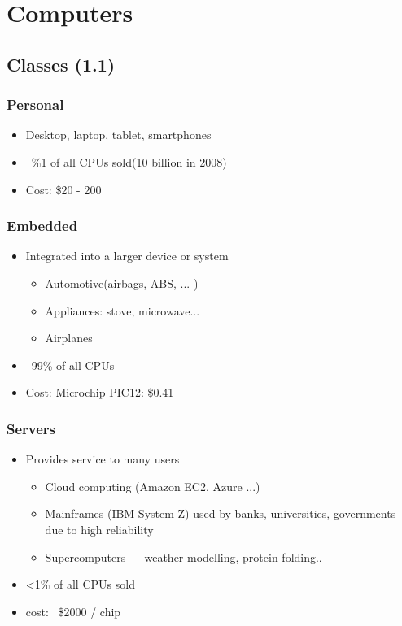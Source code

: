 \chapter{Computers}
  \section{Classes (1.1)}

    \subsection{Personal}
      \begin{itemize}
        \item Desktop, laptop, tablet, smartphones
        \item ~\%1 of all CPUs sold(10 billion in 2008)
        \item Cost: \$20 - 200
      \end{itemize}
    \subsection{Embedded}
      \begin{itemize}
        \item Integrated into a larger device or system
        \begin{itemize}
          \item Automotive(airbags, ABS, ... )
          \item Appliances: stove, microwave...
          \item Airplanes
        \end{itemize}
        \item ~99\% of all CPUs
        \item Cost: Microchip PIC12: \$0.41
      \end{itemize}

    \subsection{Servers}
      \begin{itemize}
        \item Provides service to many users
        \begin{itemize}
          \item Cloud computing (Amazon EC2, Azure ...)
          \item Mainframes (IBM System Z) used by banks, universities,
          governments due to high reliability
          \item Supercomputers --- weather modelling, protein folding..
        \end{itemize}
        \item \textless 1\% of all CPUs sold
        \item cost: ~\$2000 / chip
      \end{itemize}

